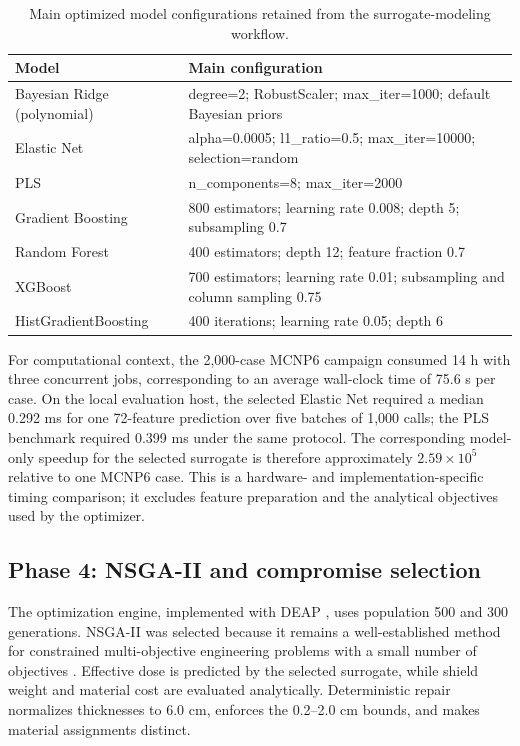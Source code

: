 \documentclass[preprint,12pt]{elsarticle}
\begin{document}
\begin{table}[htbp]
\centering\small
\caption{Main optimized model configurations retained from the surrogate-modeling workflow.}
\label{tab:hyperparameters}
\begin{tabular}{p{3.2cm}p{8.0cm}}
\toprule
Model & Main configuration\\
\midrule
Bayesian Ridge (polynomial) & degree=2; RobustScaler; max\_iter=1000; default Bayesian priors\\
Elastic Net & alpha=0.0005; l1\_ratio=0.5; max\_iter=10000; selection=random\\
PLS & n\_components=8; max\_iter=2000\\
Gradient Boosting & 800 estimators; learning rate 0.008; depth 5; subsampling 0.7\\
Random Forest & 400 estimators; depth 12; feature fraction 0.7\\
XGBoost & 700 estimators; learning rate 0.01; subsampling and column sampling 0.75\\
HistGradientBoosting & 400 iterations; learning rate 0.05; depth 6\\
\bottomrule
\end{tabular}
\end{table}

For computational context, the 2,000-case MCNP6 campaign consumed 14 h with three concurrent jobs, corresponding to an average wall-clock time of 75.6 s per case. On the local evaluation host, the selected Elastic Net required a median 0.292 ms for one 72-feature prediction over five batches of 1,000 calls; the PLS benchmark required 0.399 ms under the same protocol. The corresponding model-only speedup for the selected surrogate is therefore approximately $2.59\times10^{5}$ relative to one MCNP6 case. This is a hardware- and implementation-specific timing comparison; it excludes feature preparation and the analytical objectives used by the optimizer.

\subsection{Phase 4: NSGA-II and compromise selection}
The optimization engine, implemented with DEAP \citep{Fortin2012}, uses population 500 and 300 generations. NSGA-II was selected because it remains a well-established method for constrained multi-objective engineering problems with a small number of objectives \citep{Deb2002,DebJain2014}. Effective dose is predicted by the selected surrogate, while shield weight and material cost are evaluated analytically. Deterministic repair normalizes thicknesses to 6.0 cm, enforces the 0.2--2.0 cm bounds, and makes material assignments distinct.
\end{document}
